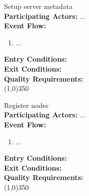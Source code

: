 		Setup server metadata \\
		\textbf{Participating Actors:}  ... \\
		\textbf{Event Flow:}
		\begin{enumerate}
\item  ...
	    \end{enumerate}
		\textbf{Entry Conditions:}\\
		\textbf{Exit Conditions:}\\
		\textbf{Quality Requirements:}\\
		\line(1,0){350}
				 
		Register nodes	\\	 
		\textbf{Participating Actors:}  ... \\
		\textbf{Event Flow:}
		\begin{enumerate}
\item  ...
	    \end{enumerate}
		\textbf{Entry Conditions:}\\
		\textbf{Exit Conditions:}\\
		\textbf{Quality Requirements:}\\
		\line(1,0){350}
